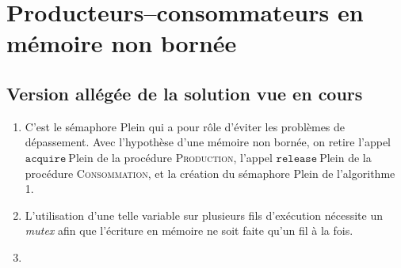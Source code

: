 \section{Producteurs--consommateurs en mémoire non bornée}

\subsection{Version allégée de la solution vue en cours}

\begin{enumerate}
	\item C'est le sémaphore $\mathrm{Plein}$\/ qui a pour rôle d'éviter les problèmes de dépassement. Avec l'hypothèse d'une mémoire non bornée, on retire l'appel $\texttt{acquire}\ \mathrm{Plein}$\/ de la procédure \textsc{Production}, l'appel $\texttt{release}\ \mathrm{Plein}$\/ de la procédure \textsc{Consommation}, et la création du sémaphore $\mathrm{Plein}$\/ de l'algorithme 1.
	\item L'utilisation d'une telle variable sur plusieurs fils d'exécution nécessite un \textit{mutex} afin que l'écriture en mémoire ne soit faite qu'un fil à la fois.
	\item 
\end{enumerate}


